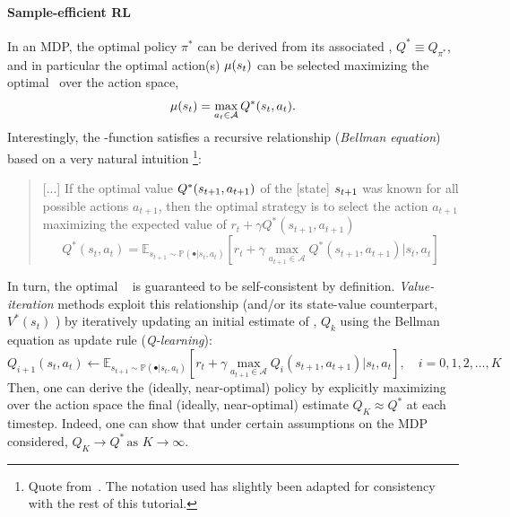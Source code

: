 \paragraph{Sample-efficient RL}
In an MDP, the optimal policy \( \pi^* \) can be derived from its associated \qfunction, \( Q^* \equiv Q_{\pi^*} \), and in particular the optimal action(s) \(\mu(s_t)\) can be selected maximizing the optimal \qfunction \ over the action space,
\[
\mu(s_t) = \max_{a_t \in \mathcal A} Q^*(s_t, a_t).
\]
Interestingly, the \qopt-function satisfies a recursive relationship (\emph{Bellman equation}) based on a very natural intuition%
\footnote{Quote from~\citet{mnihPlayingAtariDeep2013}. The notation used has slightly been adapted for consistency with the rest of this tutorial.}:
\begin{quote}
    [...] If the optimal value \( Q^*(s_{t+1}, a_{t+1}) \) of the [state] \(s_{t+1} \) was known for all possible actions \(a_{t+1} \), then the optimal strategy is to select the action \( a_{t+1}\) maximizing the expected value of \( r_t + \gamma Q^*(s_{t+1}, a_{t+1}) \)
\[ 
Q^*(s_t, a_t) = \mathbb E_{s_{t+1} \sim \mathbb P(\bullet \vert s_t, a_t)} \left[ r_t + \gamma \max_{a_{t+1} \in \mathcal A} Q^*(s_{t+1}, a_{t+1}) \big\vert s_t, a_t  \right]
\]
\end{quote}

In turn, the optimal \qfunction \ %
is guaranteed to be self-consistent by definition.
\emph{Value-iteration} methods exploit this relationship (and/or its state-value counterpart, \( V^*(s_t) \) ) by iteratively updating an initial estimate of \qopt, \( Q_k \) using the Bellman equation as update rule (\emph{Q-learning}):
\[
    Q_{i+1}(s_t, a_t) \leftarrow \mathbb E_{s_{t+1} \sim \mathbb P(\bullet \vert s_t, a_t)} \left[ r_t + \gamma \max_{a_{t+1} \in \mathcal A} Q_i (s_{t+1}, a_{t+1}) \big\vert s_t, a_t  \right],  \quad i=0,1,2,\dots,K
\]
Then, one can derive the (ideally, near-optimal) policy by explicitly maximizing over the action space the final (ideally, near-optimal) estimate \( Q_K \approx Q^* \) at each timestep. 
Indeed, one can show that under certain assumptions on the MDP considered, \( Q_K \to Q^* \, \text{as } K \to \infty \).

